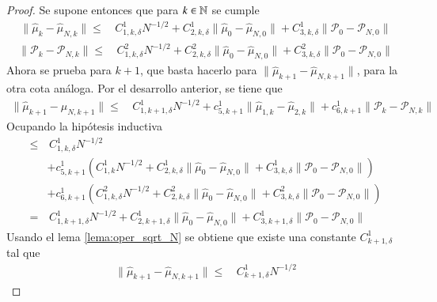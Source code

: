 \begin{proof}
	Se supone entonces que para $k \in \mathbb{N}$ se cumple 
	\begin{equation*}
		\begin{aligned}
			\| \hat \mu_{k} - \hat \mu_{N,k}  \| \leq & \, C_{1,k,\delta}^1 N^{-1/2} + C_{2,k,\delta}^1 \| \hat \mu_{0} - \hat \mu_{N, 0} \| + C_{3,k,\delta}^1 \| \mathcal{P}_{0}  - \mathcal{P}_{N, 0}  \|
		\end{aligned}
	\end{equation*}
	\begin{equation*}
		\begin{aligned}
			\| \mathcal{P}_{k} - \mathcal{P}_{N,k}  \| \leq & \, C_{1,k,\delta}^2 N^{-1/2} + C_{2,k,\delta}^2 \| \hat \mu_{0} - \hat \mu_{N, 0} \| + C_{3,k,\delta}^2 \| \mathcal{P}_{0} - \mathcal{P}_{N, 0} \|
		\end{aligned}
	\end{equation*}
	Ahora se prueba para $k+1$, que basta hacerlo para $\| \hat \mu_{k+1} - \hat \mu_{N,k+1}  \|$, para la otra cota análoga. Por el desarrollo anterior, se tiene que
	\begin{equation*}
	\begin{aligned}
		\| \hat \mu_{k+1} - \hat \mu_{N,k+1}  \| \leq & \, C_{1,k+1,\delta}^1 N^{-1/2} + c_{5,k+1}^1 \| \hat \mu_{1, k} - \hat \mu_{2, k} \| + c_{6,k+1}^1 \| \mathcal{P}_{k}  - \mathcal{P}_{N, k}  \| 
	\end{aligned}
	\end{equation*}
	Ocupando la hipótesis inductiva
	\begin{equation*}
	\begin{aligned}
		\leq & \, C_{1,k,\delta}^1 N^{-1/2} \\
		& + c_{5,k+1}^1 (C_{1,k}^1 N^{-1/2} + C_{2,k,\delta}^1 \| \hat \mu_{0} - \hat \mu_{N, 0} \| + C_{3,k,\delta}^1 \| \mathcal{P}_{0}  - \mathcal{P}_{N, 0}  \|) \\
		& + c_{6,k+1}^1 (C_{1,k,\delta}^2 N^{-1/2} + C_{2,k,\delta}^2 \| \hat \mu_{0} - \hat \mu_{N, 0} \| + C_{3,k,\delta}^2 \| \mathcal{P}_{0} - \mathcal{P}_{N, 0} \|) \\
		= & \, C_{1,k+1,\delta}^1 N^{-1/2} + C_{2,k+1,\delta}^1 \| \hat \mu_{0} - \hat \mu_{N, 0} \| + C_{3,k+1,\delta}^1 \| \mathcal{P}_{0} - \mathcal{P}_{N, 0} \|
	\end{aligned}
	\end{equation*}
	Usando el lema \ref{lema:oper_sqrt_N} se obtiene que existe una constante $C_{k+1,\delta}^1$ tal que
	\begin{equation*}
		\begin{aligned}
			\| \hat \mu_{k+1} - \hat \mu_{N,k+1}  \| \leq & \, C_{k+1,\delta}^1 N^{-1/2}
		\end{aligned}
	\end{equation*}
\end{proof}

